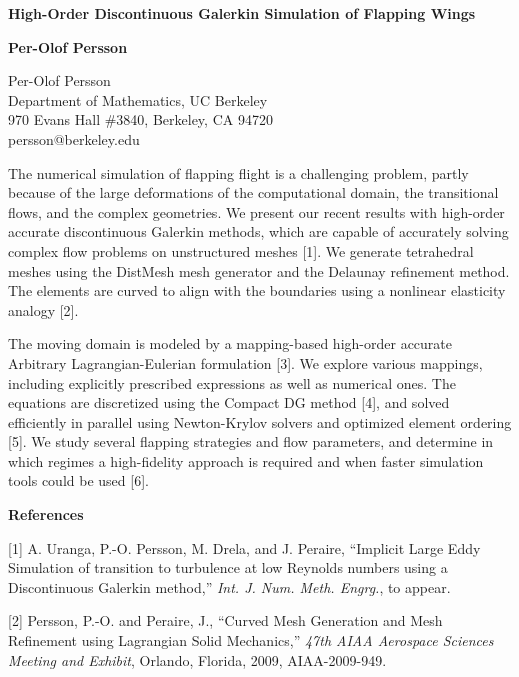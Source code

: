 

\vspace{5ex}

\begin{center}
\textbf{\large
High-Order Discontinuous Galerkin Simulation of Flapping Wings
}

\textbf{
Per-Olof Persson
}

Per-Olof Persson \\
Department of Mathematics, UC Berkeley \\
970 Evans Hall \#3840, Berkeley, CA 94720 \\
persson@berkeley.edu

\end{center}

The numerical simulation of flapping flight is a challenging
problem, partly because of the large deformations of the computational
domain, the transitional flows, and the complex geometries. We present
our recent results with high-order accurate discontinuous Galerkin
methods, which are capable of accurately solving complex flow problems
on unstructured meshes [1]. We generate tetrahedral meshes using the
DistMesh mesh generator and the Delaunay refinement method. The
elements are curved to align with the boundaries using a nonlinear
elasticity analogy [2].

The moving domain is modeled by a mapping-based high-order accurate
Arbitrary Lagrangian-Eulerian formulation [3]. We explore various
mappings, including explicitly prescribed expressions as well as
numerical ones. The equations are discretized using the Compact DG
method [4], and solved efficiently in parallel using Newton-Krylov
solvers and optimized element ordering [5]. We study several flapping
strategies and flow parameters, and determine in which regimes a
high-fidelity approach is required and when faster simulation tools
could be used [6].


\textbf{References}

[1] A. Uranga, P.-O. Persson, M. Drela, and J. Peraire, ``Implicit
Large Eddy Simulation of transition to turbulence at low Reynolds
numbers using a Discontinuous Galerkin method,'' \emph{Int. J. Num.
  Meth. Engrg.}, to appear. \\ \vspace{-9mm}

[2] Persson, P.-O. and Peraire, J., ``Curved Mesh Generation and Mesh
Refinement using Lagrangian Solid Mechanics,'' \emph{47th AIAA
  Aerospace Sciences Meeting and Exhibit}, Orlando, Florida, 2009,
AIAA-2009-949. \\ \vspace{-9mm}

